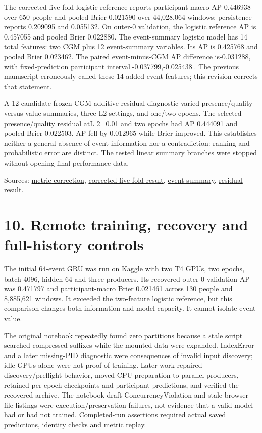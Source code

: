 \documentclass[11pt,a4paper]{article}
\begin{document}
The corrected five-fold logistic reference reports participant-macro AP 0.446938 over 650 people and pooled Brier 0.021590 over 44,028,064 windows; persistence reports 0.209095 and 0.055132. On outer-0 validation, the logistic reference AP is 0.457055 and pooled Brier 0.022880. The event-summary logistic model has 14 total features: two CGM plus 12 event-summary variables. Its AP is 0.425768 and pooled Brier 0.023462. The paired event-minus-CGM AP difference is-0.031288, with fixed-prediction participant interval[-0.037799,-0.025438]. The previous manuscript erroneously called these 14 added event features; this revision corrects that statement.

A 12-candidate frozen-CGM additive-residual diagnostic varied presence/quality versus value summaries, three L2 settings, and one/two epochs. The selected presence/quality residual atL 2=0.01 and two epochs had AP 0.444091 and pooled Brier 0.022503. AP fell by 0.012965 while Brier improved. This establishes neither a general absence of event information nor a contradiction: ranking and probabilistic error are distinct. The tested linear summary branches were stopped without opening final-performance data.

Sources: \href{corrected_pilot_recovery.md}{metric correction}, \href{loop_cgm_corrected_development_result.md}{corrected five-fold result}, \href{loop_event_summary_validation_result.md}{event summary}, \href{loop_event_residual_validation_result.md}{residual result}.

\section*{10. Remote training, recovery and full-history controls}
The initial 64-event GRU was run on Kaggle with two T4 GPUs, two epochs, batch 4096, hidden 64 and three producers. Its recovered outer-0 validation AP was 0.471797 and participant-macro Brier 0.021461 across 130 people and 8,885,621 windows. It exceeded the two-feature logistic reference, but this comparison changes both information and model capacity. It cannot isolate event value.

The original notebook repeatedly found zero partitions because a stale script searched compressed suffixes while the mounted data were expanded. IndexError and a later missing-PID diagnostic were consequences of invalid input discovery; idle GPUs alone were not proof of training. Later work repaired discovery/preflight behavior, moved CPU preparation to parallel producers, retained per-epoch checkpoints and participant predictions, and verified the recovered archive. The notebook draft ConcurrencyViolation and stale browser file listings were execution/preservation failures, not evidence that a valid model had or had not trained. Completed-run assertions required actual saved predictions, identity checks and metric replay.
\end{document}
